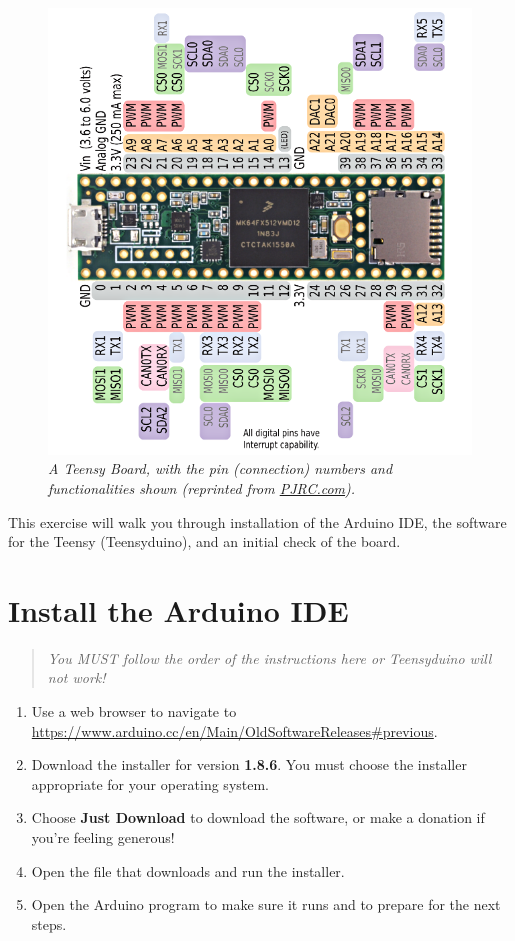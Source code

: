 \documentclass[]{book}
\providecommand{\tightlist}{%
  \setlength{\itemsep}{0pt}\setlength{\parskip}{0pt}}
\begin{document}
\begin{figure}
\centering
\includegraphics{images/card8a_rev2.png}
\caption{\emph{A Teensy Board, with the pin (connection) numbers and functionalities shown (reprinted from \href{https://www.pjrc.com/teensy/pinout.html}{PJRC.com}).}}
\end{figure}

This exercise will walk you through installation of the Arduino IDE, the software for the Teensy (Teensyduino), and an initial check of the board.

\hypertarget{install-the-arduino-ide}{%
\section{Install the Arduino IDE}\label{install-the-arduino-ide}}

\begin{quote}
\emph{You MUST follow the order of the instructions here or Teensyduino will not work!}
\end{quote}

\begin{enumerate}
\def\labelenumi{\arabic{enumi}.}
\tightlist
\item
  Use a web browser to navigate to \url{https://www.arduino.cc/en/Main/OldSoftwareReleases\#previous}.
\item
  Download the installer for version \textbf{1.8.6}. You must choose the installer appropriate for your operating system.
\item
  Choose \textbf{Just Download} to download the software, or make a donation if you're feeling generous!
\item
  Open the file that downloads and run the installer.
\item
  Open the Arduino program to make sure it runs and to prepare for the next steps.
\end{enumerate}
\end{document}

